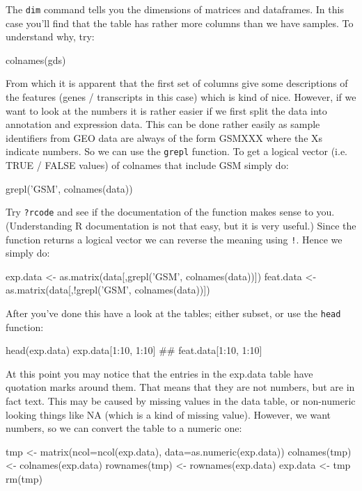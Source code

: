 \documentclass[11pt]{article}
\begin{document}
The \texttt{dim} command tells you the dimensions of matrices and dataframes. In this
case you'll find that the table has rather more columns than we have samples. 
To understand why, try:

\begin{rcode}
  colnames(gds)
\end{rcode}

From which it is apparent that the first set of columns give some descriptions of the
features (genes / transcripts in this case) which is kind of nice. However, if we
want to look at the numbers it is rather easier if we first split the data into
annotation and expression data. This can be done rather easily as sample identifiers
from GEO data are always of the form GSMXXX where the Xs indicate numbers.
So we can use the \texttt{grepl} function. To get a logical vector (i.e. TRUE / FALSE
values) of colnames that include GSM simply do:

\begin{rcode}
  grepl('GSM', colnames(data))
\end{rcode}

Try \texttt{?rcode} and see if the documentation of the function makes sense
to you. (Understanding R documentation is not that easy, but it is very useful.)
Since the function returns a logical vector we can reverse the meaning using
\texttt{!}. Hence we simply do:

\begin{rcode}
  exp.data <- as.matrix(data[,grepl('GSM', colnames(data))])
  feat.data <- as.matrix(data[,!grepl('GSM', colnames(data))])
\end{rcode}

After you've done this have a look at the tables; either subset,
or use the \texttt{head} function:

\begin{rcode}
  head(exp.data)
  exp.data[1:10, 1:10]
  ##
  feat.data[1:10, 1:10]
\end{rcode}

At this point you may notice that the entries in the exp.data table have quotation
marks around them. That means that they are not numbers, but are in fact text.
This may be caused by missing values in the data table, or non-numeric looking
things like NA (which is a kind of missing value). However, we want numbers,
so we can convert the table to a numeric one:

\begin{rcode}
  tmp <- matrix(ncol=ncol(exp.data), data=as.numeric(exp.data))
  colnames(tmp) <- colnames(exp.data)
  rownames(tmp) <- rownames(exp.data)
  exp.data <- tmp
  rm(tmp)
\end{rcode}
\end{document}
